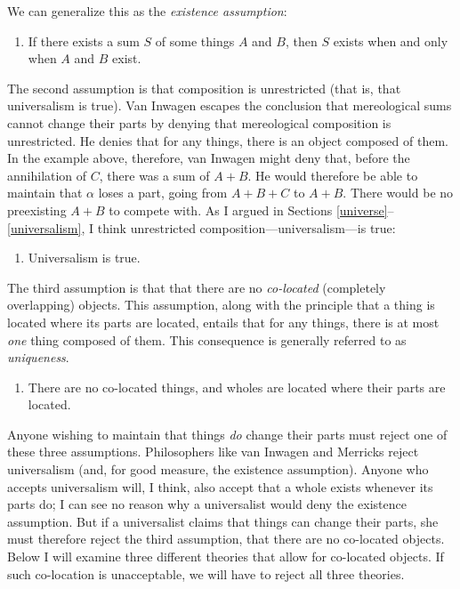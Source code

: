 \documentclass[11pt]{article}
\begin{document}
\begin{spacing}{1.5}
We can generalize this as the {\em existence assumption}:

\begin{enumerate}[ref=(\arabic*)]
  \item If there exists a sum $S$ of some things $A$ and $B$, then $S$
    exists when and only when $A$ and $B$ exist. \label{ass-ex}
\end{enumerate}

The second assumption is that composition is unrestricted (that is,
that universalism is true).  Van Inwagen escapes the conclusion that
mereological sums cannot change their parts by denying that
mereological composition is unrestricted.  He denies that for any
things, there is an object composed of them.  In the example above,
therefore, van Inwagen might deny that, before the annihilation of
$C$, there was a sum of $A + B$.  He would therefore be able to
maintain that $\alpha$ loses a part, going from $A + B + C$ to $A +
B$.  There would be no preexisting $A + B$ to compete with.  As I
argued in Sections \ref{universe}--\ref{universalism}, I think
unrestricted composition---universalism---is true:

\begin{enumerate}[start=2, ref=(\arabic*)]
  \item Universalism is true. \label{ass-uni}
\end{enumerate}

The third assumption is that that there are no {\em co-located}
(completely overlapping) objects.  This assumption, along with the
principle that a thing is located where its parts are located, entails
that for any things, there is at most {\em one} thing composed of
them.  This consequence is generally referred to as {\em uniqueness}.

\begin{enumerate}[start=3, ref=(\arabic*)]
  \item There are no co-located things, and wholes are located where
    their parts are located. \label{ass-co}
\end{enumerate}

Anyone wishing to maintain that things {\em do} change their parts
must reject one of these three assumptions.  Philosophers like van
Inwagen and Merricks reject universalism (and, for good measure, the
existence assumption).  Anyone who accepts universalism will, I think,
also accept that a whole exists whenever its parts do; I can see no
reason why a universalist would deny the existence assumption.  But if
a universalist claims that things can change their parts, she must
therefore reject the third assumption, that there are no co-located
objects.  Below I will examine three different theories that allow for
co-located objects.  If such co-location is unacceptable, we will have
to reject all three theories.


\end{spacing}
\end{document}
